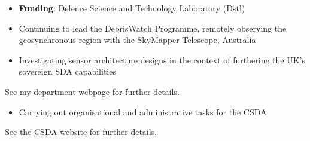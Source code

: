 \documentclass[10pt,a4paper]{altacv}
\begin{document}

\begin{fullwidth}
\makecvheader
\end{fullwidth}




\begin{itemize}
	\item \textbf{Funding}: Defence Science and Technology Laboratory (Dstl)
	\item Continuing to lead the DebrisWatch Programme, remotely observing the geosynchronous region with the SkyMapper Telescope, Australia
	\item Investigating sensor architecture designs in the context of furthering the UK's sovereign SDA capabilities
\end{itemize}
\small See my \href{https://warwick.ac.uk/fac/sci/physics/research/astro/people/jamesblake/}{department webpage} for further details.

\divider

\begin{itemize}
	\item Carrying out organisational and administrative tasks for the CSDA
\end{itemize}
\small See the \href{https://warwick.ac.uk/fac/sci/physics/research/astro/research/space_domain_awareness/}{CSDA website} for further details.
\end{document}
